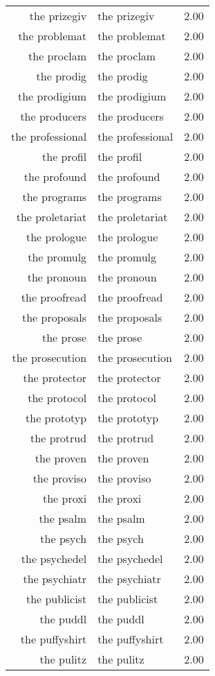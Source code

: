 \begin{table}[ht]
\begin{tabular}{rlr}
  the prizegiv & the prizegiv & 2.00 \\ 
  the problemat & the problemat & 2.00 \\ 
  the proclam & the proclam & 2.00 \\ 
  the prodig & the prodig & 2.00 \\ 
  the prodigium & the prodigium & 2.00 \\ 
  the producers & the producers & 2.00 \\ 
  the professional & the professional & 2.00 \\ 
  the profil & the profil & 2.00 \\ 
  the profound & the profound & 2.00 \\ 
  the programs & the programs & 2.00 \\ 
  the proletariat & the proletariat & 2.00 \\ 
  the prologue & the prologue & 2.00 \\ 
  the promulg & the promulg & 2.00 \\ 
  the pronoun & the pronoun & 2.00 \\ 
  the proofread & the proofread & 2.00 \\ 
  the proposals & the proposals & 2.00 \\ 
  the prose & the prose & 2.00 \\ 
  the prosecution & the prosecution & 2.00 \\ 
  the protector & the protector & 2.00 \\ 
  the protocol & the protocol & 2.00 \\ 
  the prototyp & the prototyp & 2.00 \\ 
  the protrud & the protrud & 2.00 \\ 
  the proven & the proven & 2.00 \\ 
  the proviso & the proviso & 2.00 \\ 
  the proxi & the proxi & 2.00 \\ 
  the psalm & the psalm & 2.00 \\ 
  the psych & the psych & 2.00 \\ 
  the psychedel & the psychedel & 2.00 \\ 
  the psychiatr & the psychiatr & 2.00 \\ 
  the publicist & the publicist & 2.00 \\ 
  the puddl & the puddl & 2.00 \\ 
  the puffyshirt & the puffyshirt & 2.00 \\ 
  the pulitz & the pulitz & 2.00 \\ 

\end{tabular}
\end{table}
